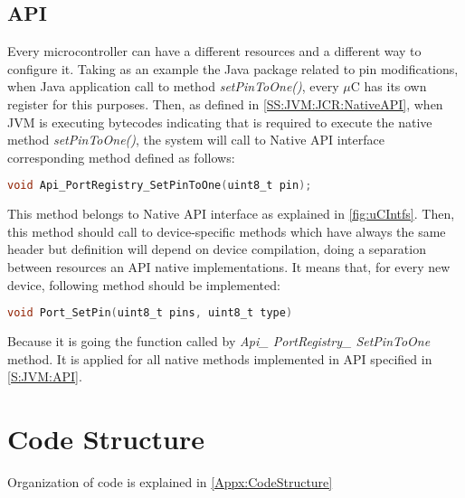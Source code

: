 \subsection{API}\label{SS:JVM:Micros:API}
Every microcontroller can have a different resources and a different way to configure it. Taking as an example the Java package related to pin modifications, when Java application call to method \textit{setPinToOne()}, every $\mu$C has its own register for this purposes. Then, as defined in \ref{SS:JVM:JCR:NativeAPI}, when JVM is executing bytecodes indicating that is required to execute the native method \textit{setPinToOne()}, the system will call to Native API interface corresponding method defined as follows:

\medskip
\begin{lstlisting}[language=C]
void Api_PortRegistry_SetPinToOne(uint8_t pin);
\end{lstlisting}
\medskip

This method belongs to Native API interface as explained in \ref{fig:uCIntfs}. Then, this method should call to device-specific methods which have always the same header but definition will depend on device compilation, doing a separation between resources an API native implementations. It means that, for every new device, following method should be implemented:

\medskip
\begin{lstlisting}[language=C]
void Port_SetPin(uint8_t pins, uint8_t type)
\end{lstlisting}
\medskip

Because it is going the function called by \textit{Api\_ PortRegistry\_ SetPinToOne} method. It is applied for all native methods implemented in API specified in \ref{S:JVM:API}.

\section{Code Structure}\label{S:JVM:Code}
Organization of code is explained in \ref{Appx:CodeStructure}
